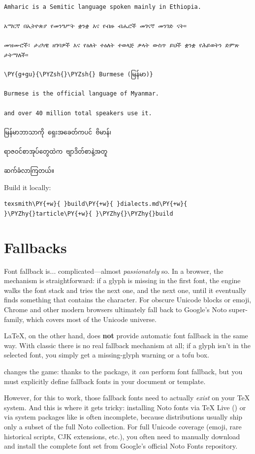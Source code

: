 \documentclass[a4paper,twoside]{article}
\begin{document}
\begin{tscode}[lang=markdown, engine=pygments]
\begin{Verbatim}[commandchars=\\\{\},breaklines, breakanywhere, commandchars=\\\{\}]
Amharic is a Semitic language spoken mainly in Ethiopia.

አማርኛ በኢትዮጵያ የመንግሥት ቋንቋ እና የብዙ ብሔሮች መገናኛ መንገድ ናት።

መዝሙሮች፣ ታሪካዊ ዘገባዎች እና የዕለት ተዕለት ተወላጅ ቃላት ውስጥ ይህች ቋንቋ የሕይወትን ድምጽ ታትማለች።

\PY{g+gu}{\PYZsh{}\PYZsh{} Burmese (မြန်မာ)}

Burmese is the official language of Myanmar.

and over 40 million total speakers use it.

မြန်မာဘာသာကို ရှေးအခေတ်ကပင် ဗိမာန်၊

ရာဇဝင်စာအုပ်တွေထဲက ဗျာဒိတ်စာနဲ့အတူ

ဆက်ခံလာကြတယ်။
\end{Verbatim}
\end{tscode}
Build it locally:
\begin{tscode}[lang=bash, engine=pygments]
\begin{Verbatim}[commandchars=\\\{\},breaklines, breakanywhere, commandchars=\\\{\}]
texsmith\PY{+w}{ }build\PY{+w}{ }dialects.md\PY{+w}{ }\PYZhy{}tarticle\PY{+w}{ }\PYZhy{}\PYZhy{}build
\end{Verbatim}
\end{tscode}
\section{Fallbacks}
Font fallback is... complicated---almost \emph{passionately} so. In a browser, the mechanism is straightforward: if a glyph is missing in the first font, the engine walks the font stack and tries the next one, and the next one, until it eventually finds something that contains the character. For obscure Unicode blocks or emoji, Chrome and other modern browsers ultimately fall back to Google's Noto super-family, which covers most of the Unicode universe.

\LaTeX{}, on the other hand, does \textbf{not} provide automatic font fallback in the same way. With classic  there is no real fallback mechanism at all; if a glyph isn't in the selected font, you simply get a missing-glyph warning or a tofu box.

 changes the game: thanks to the  package, it \emph{can} perform font fallback, but you must explicitly define fallback fonts in your document or template.

However, for this to work, those fallback fonts need to actually \emph{exist} on your \TeX{} system. And this is where it gets tricky: installing Noto fonts via \TeX{} Live () or via system packages like  is often incomplete, because distributions usually ship only a subset of the full Noto collection. For full Unicode coverage (emoji, rare historical scripts, CJK extensions, etc.), you often need to manually download and install the complete font set from Google's official Noto Fonts repository.
\end{document}

